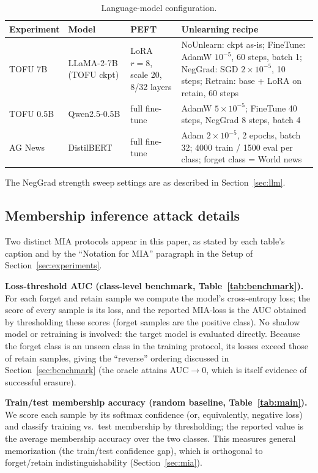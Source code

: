 \documentclass[smallextended]{svjour3}       %
\begin{document}
\begin{table}[t]
\centering
\footnotesize
\caption{Language-model configuration.}
\label{tab:exp_llm}
\setlength{\tabcolsep}{2pt}
\begin{tabular}{@{}p{1.4cm} p{3.0cm} p{2.8cm} p{4.4cm}@{}}
\toprule
Experiment & Model & PEFT & Unlearning recipe \\
\midrule
TOFU 7B & LLaMA-2-7B (TOFU ckpt) & LoRA $r{=}8$, scale 20, 8/32 layers & NoUnlearn: ckpt as-is; FineTune: AdamW $10^{-5}$, 60 steps, batch 1; NegGrad: SGD $2{\times}10^{-5}$, 10 steps; Retrain: base + LoRA on retain, 60 steps \\
TOFU 0.5B & Qwen2.5-0.5B & full fine-tune & AdamW $5{\times}10^{-5}$; FineTune 40 steps, NegGrad 8 steps, batch 4 \\
AG News & DistilBERT & full fine-tune & Adam $2{\times}10^{-5}$, 2 epochs, batch 32; 4000 train / 1500 eval per class; forget class = World news \\
\bottomrule
\end{tabular}
\end{table}

The NegGrad strength sweep settings are as described in Section~\ref{sec:llm}.

\subsection{Membership inference attack details}
\label{app:mia}

Two distinct MIA protocols appear in this paper, as stated by each table's caption and by the ``Notation for MIA'' paragraph in the Setup of Section~\ref{sec:experiments}.

\textbf{Loss-threshold AUC (class-level benchmark, Table~\ref{tab:benchmark}).} For each forget and retain sample we compute the model's cross-entropy loss; the score of every sample is its loss, and the reported MIA-loss is the AUC obtained by thresholding these scores (forget samples are the positive class). No shadow model or retraining is involved: the target model is evaluated directly. Because the forget class is an unseen class in the training protocol, its losses exceed those of retain samples, giving the ``reverse'' ordering discussed in Section~\ref{sec:benchmark} (the oracle attains AUC${\to}0$, which is itself evidence of successful erasure).

\textbf{Train/test membership accuracy (random baseline, Table~\ref{tab:main}).} We score each sample by its softmax confidence (or, equivalently, negative loss) and classify training vs.\ test membership by thresholding; the reported value is the average membership accuracy over the two classes. This measures general memorization (the train/test confidence gap), which is orthogonal to forget/retain indistinguishability (Section~\ref{sec:mia}).
\end{document}
